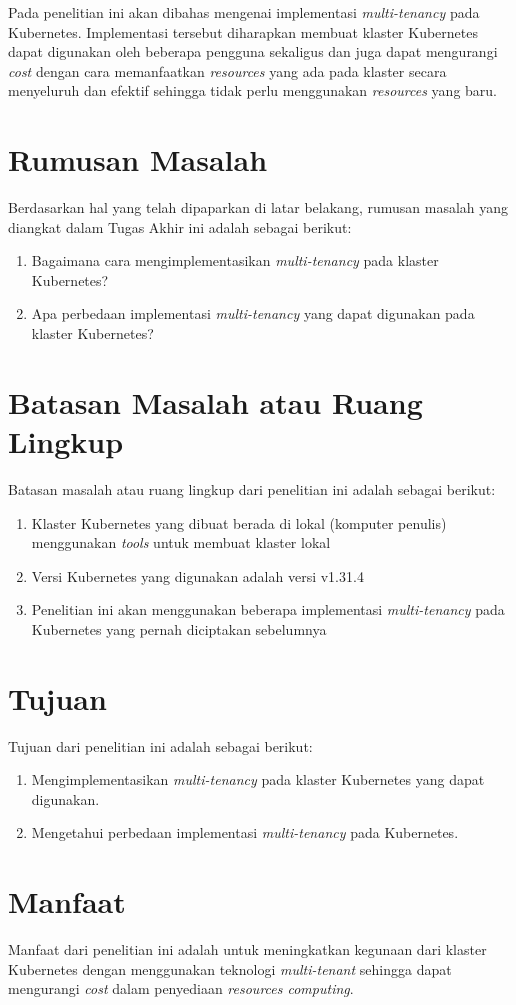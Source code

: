 Pada penelitian ini akan dibahas mengenai implementasi \emph{multi-tenancy}
pada Kubernetes. Implementasi tersebut diharapkan membuat klaster
Kubernetes dapat digunakan oleh beberapa pengguna sekaligus dan juga dapat
mengurangi \emph{cost} dengan cara memanfaatkan \emph{resources} yang ada
pada klaster secara menyeluruh dan efektif sehingga tidak perlu menggunakan
\emph{resources} yang baru.

\section{Rumusan Masalah}

Berdasarkan hal yang telah dipaparkan di latar belakang, rumusan masalah
yang diangkat dalam Tugas Akhir ini adalah sebagai berikut:
\begin{enumerate}[itemsep=-0.2cm, topsep=-0.3cm]
  \item{Bagaimana cara mengimplementasikan \emph{multi-tenancy} pada klaster Kubernetes?}
  \item{Apa perbedaan implementasi \emph{multi-tenancy} yang dapat digunakan pada klaster Kubernetes?}
\end{enumerate}

\section{Batasan Masalah atau Ruang Lingkup}

Batasan masalah atau ruang lingkup dari penelitian ini adalah sebagai berikut:
\begin{enumerate}[itemsep=-0.2cm, topsep=-0.3cm]
  \item{Klaster Kubernetes yang dibuat berada di lokal (komputer penulis) menggunakan \emph{tools} untuk membuat klaster lokal}
  \item{Versi Kubernetes yang digunakan adalah versi v1.31.4}
  \item{Penelitian ini akan menggunakan beberapa implementasi \emph{multi-tenancy} pada Kubernetes yang pernah diciptakan sebelumnya}
\end{enumerate}

\section{Tujuan}

Tujuan dari penelitian ini adalah sebagai berikut:
\begin{enumerate}[itemsep=-0.2cm, topsep=-0.3cm]
  \item{Mengimplementasikan \emph{multi-tenancy} pada klaster Kubernetes yang dapat digunakan.}
  \item{Mengetahui perbedaan implementasi \emph{multi-tenancy} pada Kubernetes.}
\end{enumerate}

\section{Manfaat}

Manfaat dari penelitian ini adalah untuk meningkatkan kegunaan dari
klaster Kubernetes dengan menggunakan teknologi \emph{multi-tenant}
sehingga dapat mengurangi \emph{cost} dalam penyediaan
\emph{resources computing}.
